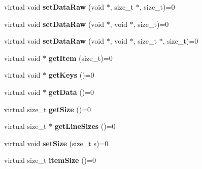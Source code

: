 \begin{DoxyCompactItemize}
\hypertarget{classfaster_1_1workerFddBase_acb1d91424c30dfc596b2e437605fa613}{}\label{classfaster_1_1workerFddBase_acb1d91424c30dfc596b2e437605fa613} 
virtual void {\bfseries set\+Data\+Raw} (void $\ast$, size\+\_\+t $\ast$, size\+\_\+t)=0
\item 
\hypertarget{classfaster_1_1workerFddBase_a9a6dd9e0a89281b14486c685ff15d22b}{}\label{classfaster_1_1workerFddBase_a9a6dd9e0a89281b14486c685ff15d22b} 
virtual void {\bfseries set\+Data\+Raw} (void $\ast$, void $\ast$, size\+\_\+t)=0
\item 
\hypertarget{classfaster_1_1workerFddBase_a5d73e6097368101ce3af5eef1309bdff}{}\label{classfaster_1_1workerFddBase_a5d73e6097368101ce3af5eef1309bdff} 
virtual void {\bfseries set\+Data\+Raw} (void $\ast$, void $\ast$, size\+\_\+t $\ast$, size\+\_\+t)=0
\item 
\hypertarget{classfaster_1_1workerFddBase_a602b1ad564266ed18e873e24f1418e1b}{}\label{classfaster_1_1workerFddBase_a602b1ad564266ed18e873e24f1418e1b} 
virtual void $\ast$ {\bfseries get\+Item} (size\+\_\+t)=0
\item 
\hypertarget{classfaster_1_1workerFddBase_a65ea9b06048b3cef3757aec9738ec07f}{}\label{classfaster_1_1workerFddBase_a65ea9b06048b3cef3757aec9738ec07f} 
virtual void $\ast$ {\bfseries get\+Keys} ()=0
\item 
\hypertarget{classfaster_1_1workerFddBase_af315b09bb75b414d4840c4d0fd3d307f}{}\label{classfaster_1_1workerFddBase_af315b09bb75b414d4840c4d0fd3d307f} 
virtual void $\ast$ {\bfseries get\+Data} ()=0
\item 
\hypertarget{classfaster_1_1workerFddBase_ab3b64bebf2d7046a583b1e391ba69d1a}{}\label{classfaster_1_1workerFddBase_ab3b64bebf2d7046a583b1e391ba69d1a} 
virtual size\+\_\+t {\bfseries get\+Size} ()=0
\item 
\hypertarget{classfaster_1_1workerFddBase_a9ae5dce20da30fb989599257ab940bf8}{}\label{classfaster_1_1workerFddBase_a9ae5dce20da30fb989599257ab940bf8} 
virtual size\+\_\+t $\ast$ {\bfseries get\+Line\+Sizes} ()=0
\item 
\hypertarget{classfaster_1_1workerFddBase_ad0ce609bfa4571280c01ff618b2f6706}{}\label{classfaster_1_1workerFddBase_ad0ce609bfa4571280c01ff618b2f6706} 
virtual void {\bfseries set\+Size} (size\+\_\+t s)=0
\item 
\hypertarget{classfaster_1_1workerFddBase_a11e77f238c760ce939ceeaa7f36a7899}{}\label{classfaster_1_1workerFddBase_a11e77f238c760ce939ceeaa7f36a7899} 
virtual size\+\_\+t {\bfseries item\+Size} ()=0
\item 

\end{DoxyCompactItemize}
